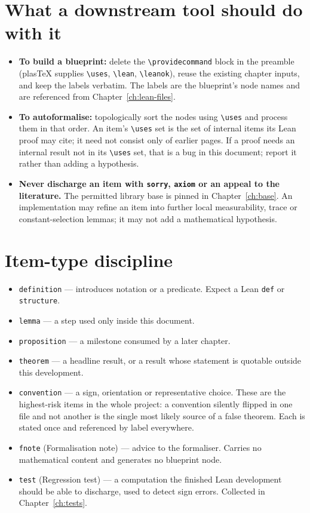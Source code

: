\section*{What a downstream tool should do with it}

\begin{itemize}
\item \textbf{To build a blueprint:} delete the \verb|\providecommand| block
  in the preamble (plasTeX supplies \verb|\uses|, \verb|\lean|, \verb|\leanok|),
  reuse the existing chapter inputs, and keep the labels verbatim.
  The labels are the blueprint's node names
  and are referenced from Chapter~\ref{ch:lean-files}.
\item \textbf{To autoformalise:} topologically sort the nodes using
  \verb|\uses| and process them in that order.  An item's \verb|\uses| set is
  the set of internal items its Lean proof may cite; it need not consist only
  of earlier pages.  If a proof needs an internal result not in its
  \verb|\uses| set, that is a bug in this document; report it rather than
  adding a hypothesis.
\item \textbf{Never discharge an item with \texttt{sorry}, \texttt{axiom} or
  an appeal to the literature.}  The permitted library base is pinned in
  Chapter~\ref{ch:base}.  An implementation may refine an item into further
  local measurability, trace or constant-selection lemmas; it may not add a
  mathematical hypothesis.
\end{itemize}

\section*{Item-type discipline}

\begin{itemize}
\item \texttt{definition} --- introduces notation or a predicate.  Expect a
  Lean \texttt{def} or \texttt{structure}.
\item \texttt{lemma} --- a step used only inside this document.
\item \texttt{proposition} --- a milestone consumed by a later chapter.
\item \texttt{theorem} --- a headline result, or a result whose statement is
  quotable outside this development.
\item \texttt{convention} --- a sign, orientation or representative choice.
  These are the highest-risk items in the whole project: a convention silently
  flipped in one file and not another is the single most likely source of a
  false theorem.  Each is stated once and referenced by label everywhere.
\item \texttt{fnote} (Formalisation note) --- advice to the formaliser.
  Carries no mathematical content and generates no blueprint node.
\item \texttt{test} (Regression test) --- a computation the finished Lean
  development should be able to discharge, used to detect sign errors.
  Collected in Chapter~\ref{ch:tests}.
\end{itemize}


